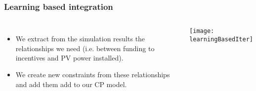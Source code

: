 \documentclass{beamer}
\begin{document}
	\begin{frame}
	\frametitle{Learning based integration}
		\begin{columns}
			\begin{itemize}
				\item We extract from the simulation results the relationships we need (i.e. between funding to incentives and PV power installed).
				\item We create new constraints from these relationships and add them add to our CP model.
			\end{itemize}
			\centering
			\texttt{[image: learningBasedIter]}
		\end{columns}
	\end{frame}
\end{document}
